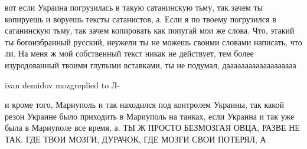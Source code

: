 
вот если Украина погрузилась в такую сатанинскую тьму, так зачем ты копируешь и
воруешь тексты сатанистов, а. Если я по твоему погрузился в сатанинскую тьму,
так зачем копировать как попугай мои же слова. Что, этакий ты богоизбранный
русский, неужели ты не можешь своими словами написать, что ли. На меня ж мой
собственный текст никак не действует, тем более изуродованный твоими глупыми
вставками, ты не подумал, дааааааааааааааааааа

ivan demidov mozgreplied to Л-

и кроме того, Мариуполь и так находился под контролем Украины, так какой резон
Украине было приходить в Мариуполь на танках, если Украина и так уже была в
Мариуполе все время, а. ТЫ Ж ПРОСТО БЕЗМОЗГАЯ ОВЦА, РАЗВЕ НЕ ТАК. ГДЕ ТВОИ
МОЗГИ, ДУРАЧОК, ГДЕ МОЗГИ СВОИ ПОТЕРЯЛ, А
